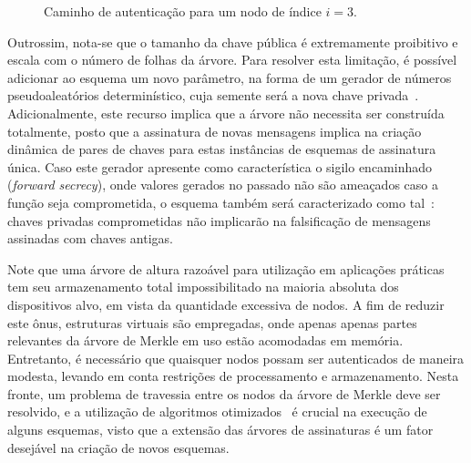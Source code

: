 \documentclass[12pt]{report}
\newcommand{\pk}{\mathcal{P}_k}
\begin{document}
\begin{figure}
    \centering
    \caption{Caminho de autenticação para um nodo de índice $i = 3$.}
    \label{fig:9}
\end{figure}

Outrossim, nota-se que o tamanho da chave pública é extremamente proibitivo e escala com o número de folhas da árvore. Para resolver esta limitação, é possível adicionar ao esquema um novo parâmetro, na forma de um gerador de números pseudoaleatórios determinístico, cuja semente será a nova chave privada~\cite[6.4.2.3]{Goldreich:2004:FCV:975541}. Adicionalmente, este recurso implica que a árvore não necessita ser construída totalmente, posto que a assinatura de novas mensagens implica na criação dinâmica de pares de chaves para estas instâncias de esquemas de assinatura única. Caso este gerador apresente como característica o sigilo encaminhado (\emph{forward secrecy}), onde valores gerados no passado não são ameaçados caso a função seja comprometida, o esquema também será caracterizado como tal~\cite{Bernstein:2008:PQC:1522375}: chaves privadas comprometidas não implicarão na falsificação de mensagens assinadas com chaves antigas.

Note que uma árvore de altura razoável para utilização em aplicações práticas tem seu armazenamento total impossibilitado na maioria absoluta dos dispositivos alvo, em vista da quantidade excessiva de nodos. A fim de reduzir este ônus, estruturas virtuais são empregadas, onde apenas apenas partes relevantes da árvore de Merkle em uso estão acomodadas em memória. Entretanto, é necessário que quaisquer nodos possam ser autenticados de maneira modesta, levando em conta restrições de processamento e armazenamento. Nesta fronte, um problema de travessia entre os nodos da árvore de Merkle deve ser resolvido, e a utilização de algoritmos otimizados~\cite{Buchmann:2008:MTT:1473109.1473114} é crucial na execução de alguns esquemas, visto que a extensão das árvores de assinaturas é um fator desejável na criação de novos esquemas.
\end{document}
